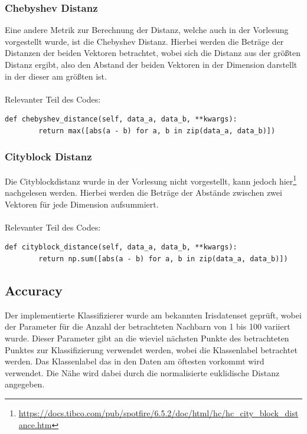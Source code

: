 \documentclass{article}
\begin{document}
\subsubsection{Chebyshev Distanz}
Eine andere Metrik zur Berechnung der Distanz, welche auch in der Vorlesung vorgestellt wurde, ist die Chebyshev Distanz. Hierbei werden die Beträge der Distanzen der beiden Vektoren betrachtet, wobei sich die Distanz aus der größten Distanz ergibt, also den Abstand der beiden Vektoren in der Dimension darstellt in der dieser am größten ist. 
\paragraph{}
Relevanter Teil des Codes:
\begin{lstlisting}[title=Chebyshev Distanz]
    def chebyshev_distance(self, data_a, data_b, **kwargs):
        return max([abs(a - b) for a, b in zip(data_a, data_b)])
\end{lstlisting}

\subsubsection{Cityblock Distanz}
Die Cityblockdistanz wurde in der Vorlesung nicht vorgestellt, kann jedoch hier\footnote{\url{https://docs.tibco.com/pub/spotfire/6.5.2/doc/html/hc/hc_city_block_distance.htm}} nachgelesen werden. Hierbei werden die Beträge der Abstände zwischen zwei Vektoren für jede Dimension aufsummiert.
\paragraph{}
Relevanter Teil des Codes:
\begin{lstlisting}[title=Cityblock Distanz]
    def cityblock_distance(self, data_a, data_b, **kwargs):
        return np.sum([abs(a - b) for a, b in zip(data_a, data_b)])
\end{lstlisting}

\subsection{Accuracy}
Der implementierte Klassifizierer wurde am bekannten Irisdatenset geprüft, wobei der Parameter für die Anzahl der betrachteten Nachbarn von 1 bis 100 variiert wurde. Dieser Parameter gibt an die wieviel nächsten Punkte des betrachteten Punktes zur Klassifizierung verwendet werden, wobei die Klassenlabel betrachtet werden. Das Klassenlabel das in den Daten am öftesten vorkommt wird verwendet. Die Nähe wird dabei durch die normalisierte euklidische Distanz angegeben.
\end{document}
